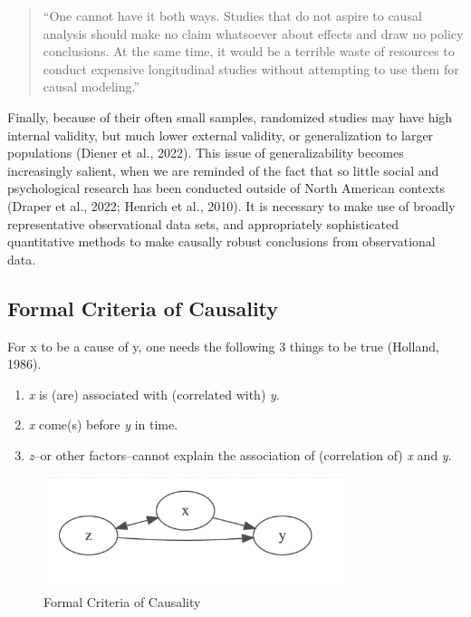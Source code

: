 \documentclass[
  letterpaper,
  DIV=11,
  numbers=noendperiod]{scrreprt}
\providecommand{\tightlist}{%
  \setlength{\itemsep}{0pt}\setlength{\parskip}{0pt}}\usepackage{longtable,booktabs,array}
\begin{document}
\begin{quote}
``One cannot have it both ways. Studies that do not aspire to causal
analysis should make no claim whatsoever about effects and draw no
policy conclusions. At the same time, it would be a terrible waste of
resources to conduct expensive longitudinal studies without attempting
to use them for causal modeling.''
\end{quote}

Finally, because of their often small samples, randomized studies may
have high internal validity, but much lower external validity, or
generalization to larger populations (Diener et al., 2022). This issue
of generalizability becomes increasingly salient, when we are reminded
of the fact that so little social and psychological research has been
conducted outside of North American contexts (Draper et al., 2022;
Henrich et al., 2010). It is necessary to make use of broadly
representative observational data sets, and appropriately sophisticated
quantitative methods to make causally robust conclusions from
observational data.

\hypertarget{formal-criteria-of-causality}{%
\subsection{Formal Criteria of
Causality}\label{formal-criteria-of-causality}}

For x to be a cause of y, one needs the following 3 things to be true
(Holland, 1986).

\begin{enumerate}
\def\labelenumi{\arabic{enumi}.}
\tightlist
\item
  \emph{x} is (are) associated with (correlated with) \emph{y}.
\item
  \emph{x} come(s) before \emph{y} in time.
\item
  \emph{z}--or other factors--cannot explain the association of
  (correlation of) \emph{x} and \emph{y}.
\end{enumerate}

\begin{figure}

{\centering \includegraphics[width=3.46in,height=\textheight]{./fig-causality.png}

}

\caption{\label{fig-causality}Formal Criteria of Causality}

\end{figure}
\end{document}
